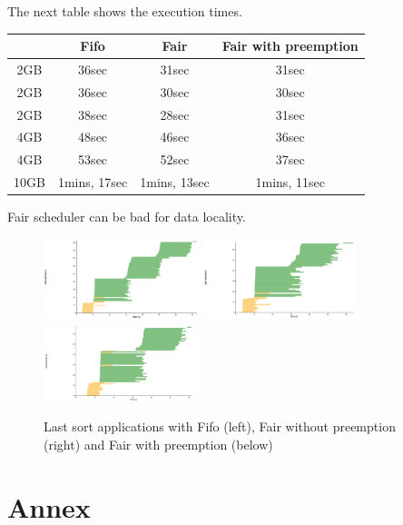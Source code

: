 \documentclass{article}
\begin{document}

The next table shows the execution times.

\begin{center}
\begin{tabular}{|c|c|c|c|}
\hline
\ & Fifo & Fair & Fair with preemption \\
\hline
2GB & 36sec & 31sec & 31sec \\
\hline
2GB & 36sec & 30sec & 30sec \\
\hline
2GB & 38sec & 28sec & 31sec \\
\hline
4GB & 48sec & 46sec & 36sec \\
\hline
4GB & 53sec & 52sec & 37sec \\
\hline
10GB & 1mins, 17sec & 1mins, 13sec & 1mins, 11sec \\
\hline
\end{tabular}
\end{center}

Fair scheduler can be bad for data locality.

\begin{figure}%
  \centering
  \includegraphics[width=0.4\textwidth]{fifo2.png}
  \includegraphics[width=0.4\textwidth]{fair2.png}
  \includegraphics[width=0.4\textwidth]{fair_preemp2.png}
  \caption{Last sort applications with Fifo (left), Fair without preemption (right) and Fair with preemption (below)}
  \label{fair}
\end{figure}



\section*{Annex}
\end{document}
